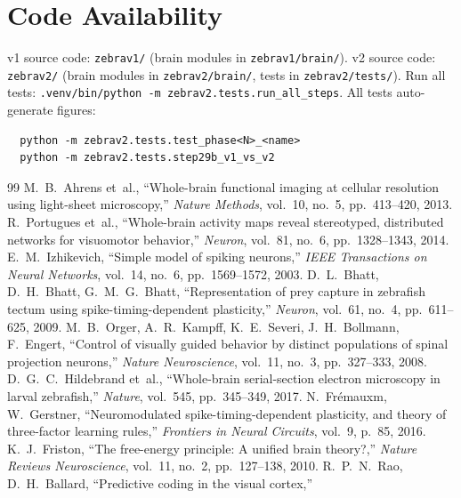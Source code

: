 \documentclass[11pt,a4paper]{article}
\begin{document}
\section{Code Availability}

v1 source code: \texttt{zebrav1/} (brain modules in \texttt{zebrav1/brain/}).
v2 source code: \texttt{zebrav2/} (brain modules in \texttt{zebrav2/brain/}, tests in \texttt{zebrav2/tests/}).
Run all tests: \texttt{.venv/bin/python -m zebrav2.tests.run\_all\_steps}.
All tests auto-generate figures:
\begin{verbatim}
  python -m zebrav2.tests.test_phase<N>_<name>
  python -m zebrav2.tests.step29b_v1_vs_v2
\end{verbatim}

\begin{thebibliography}{99}
  M.~B.~Ahrens et~al.,
  ``Whole-brain functional imaging at cellular resolution using light-sheet microscopy,''
  \textit{Nature Methods}, vol.~10, no.~5, pp.~413--420, 2013.
  R.~Portugues et~al.,
  ``Whole-brain activity maps reveal stereotyped, distributed networks for visuomotor behavior,''
  \textit{Neuron}, vol.~81, no.~6, pp.~1328--1343, 2014.
  E.~M.~Izhikevich,
  ``Simple model of spiking neurons,''
  \textit{IEEE Transactions on Neural Networks}, vol.~14, no.~6, pp.~1569--1572, 2003.
  D.~L.~Bhatt, D.~H.~Bhatt, G.~M.~G.~Bhatt,
  ``Representation of prey capture in zebrafish tectum using spike-timing-dependent plasticity,''
  \textit{Neuron}, vol.~61, no.~4, pp.~611--625, 2009.
  M.~B.~Orger, A.~R.~Kampff, K.~E.~Severi, J.~H.~Bollmann, F.~Engert,
  ``Control of visually guided behavior by distinct populations of spinal projection neurons,''
  \textit{Nature Neuroscience}, vol.~11, no.~3, pp.~327--333, 2008.
  D.~G.~C.~Hildebrand et~al.,
  ``Whole-brain serial-section electron microscopy in larval zebrafish,''
  \textit{Nature}, vol.~545, pp.~345--349, 2017.
  N.~Frémauxm, W.~Gerstner,
  ``Neuromodulated spike-timing-dependent plasticity, and theory of three-factor learning rules,''
  \textit{Frontiers in Neural Circuits}, vol.~9, p.~85, 2016.
  K.~J.~Friston,
  ``The free-energy principle: A unified brain theory?,''
  \textit{Nature Reviews Neuroscience}, vol.~11, no.~2, pp.~127--138, 2010.
  R.~P.~N.~Rao, D.~H.~Ballard,
  ``Predictive coding in the visual cortex,''

\end{thebibliography}
\end{document}
